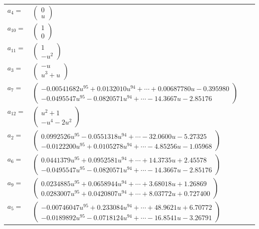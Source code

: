 \documentclass[1p]{elsarticle_modified}
\theoremstyle{definition}
\begin{document}
\begin{tabular}{m{7pt} m{180pt} m{7pt} m{180pt} }
\flushright $a_{4}=$&$\begin{pmatrix}0\\u\end{pmatrix}$ \\
\flushright $a_{10}=$&$\begin{pmatrix}1\\0\end{pmatrix}$ \\
\flushright $a_{11}=$&$\begin{pmatrix}1\\- u^2\end{pmatrix}$ \\
\flushright $a_{3}=$&$\begin{pmatrix}- u\\u^3+u\end{pmatrix}$ \\
\flushright $a_{7}=$&$\begin{pmatrix}-0.00541682 u^{95}+0.0132010 u^{94}+\cdots+0.00687780 u-0.395980\\-0.0495547 u^{95}-0.0820571 u^{94}+\cdots-14.3667 u-2.85176\end{pmatrix}$ \\
\flushright $a_{12}=$&$\begin{pmatrix}u^2+1\\- u^4-2 u^2\end{pmatrix}$ \\
\flushright $a_{2}=$&$\begin{pmatrix}0.0992526 u^{95}-0.0551318 u^{94}+\cdots-32.0600 u-5.27325\\-0.0122200 u^{95}+0.0105278 u^{94}+\cdots-4.85256 u-1.05968\end{pmatrix}$ \\
\flushright $a_{6}=$&$\begin{pmatrix}0.0441379 u^{95}+0.0952581 u^{94}+\cdots+14.3735 u+2.45578\\-0.0495547 u^{95}-0.0820571 u^{94}+\cdots-14.3667 u-2.85176\end{pmatrix}$ \\
\flushright $a_{9}=$&$\begin{pmatrix}0.0234885 u^{95}+0.0658944 u^{94}+\cdots+3.68018 u+1.26869\\0.0283007 u^{95}+0.0420807 u^{94}+\cdots+8.03772 u+0.727400\end{pmatrix}$ \\
\flushright $a_{5}=$&$\begin{pmatrix}-0.00746047 u^{95}+0.233084 u^{94}+\cdots+48.9621 u+6.70772\\-0.0189892 u^{95}-0.0718124 u^{94}+\cdots-16.8541 u-3.26791\end{pmatrix}$ \\

\end{tabular}
\end{document}

